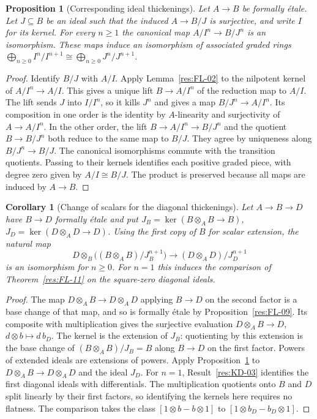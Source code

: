 \documentclass[11pt,oneside,openany]{book}
\newtheorem{proposition}[theorem]{Proposition}
\newtheorem{corollary}[theorem]{Corollary}
\theoremstyle{definition}
\theoremstyle{remark}
\begin{document}
\begin{proposition}[Corresponding ideal thickenings]\label{res:FL-14}
Let $A\to B$ be formally \'{e}tale. Let $J\subseteq B$ be an ideal such
that the induced $A\to B/J$ is surjective, and write $I$ for its kernel.
For every $n\ge1$ the canonical map
$A/I^n\to B/J^n$ is an isomorphism. These maps induce an isomorphism of
associated graded rings
$\bigoplus_{n\ge0} I^n/I^{n+1}\cong\bigoplus_{n\ge0}J^n/J^{n+1}$.
\end{proposition}
\begin{proof}
Identify $B/J$ with $A/I$. Apply Lemma~\ref{res:FL-02} to the nilpotent
kernel of $A/I^n\to A/I$. This gives a unique lift
$B\to A/I^n$ of the reduction map to $A/I$. The lift sends $J$ into
$I/I^n$, so it kills $J^n$ and gives a map $B/J^n\to A/I^n$.
Its composition in one order is the identity by $A$-linearity and
surjectivity of $A\to A/I^n$. In the other order, the lift
$B\to A/I^n\to B/J^n$ and the quotient $B\to B/J^n$ both reduce to the same
map to $B/J$. They agree by uniqueness along $B/J^n\to B/J$.
The canonical isomorphisms commute with the transition quotients.
Passing to their kernels identifies each positive graded piece, with
degree zero given by $A/I\cong B/J$. The product is preserved because all
maps are induced by $A\to B$.
\end{proof}

\begin{corollary}[Change of scalars for the diagonal thickenings]
\label{res:FL-15}
Let $A\to B\to D$ have $B\to D$ formally \'{e}tale and put
$J_B=\ker(B\otimes_A B\to B)$, $J_D=\ker(D\otimes_A D\to D)$.
Using the first copy of $B$ for scalar extension, the natural map
\[
 D\otimes_B \bigl((B\otimes_A B)/J_B^{n+1}\bigr)
    \longrightarrow (D\otimes_A D)/J_D^{n+1}
\]
is an isomorphism for $n\ge0$. For $n=1$ this induces the comparison of
Theorem~\ref{res:FL-11} on the square-zero diagonal ideals.
\end{corollary}
\begin{proof}
The map $D\otimes_A B\to D\otimes_A D$ applying $B\to D$ on the second
factor is a base change of that map, and so is formally \'{e}tale by
Proposition~\ref{res:FL-09}. Its composite with multiplication gives
the surjective evaluation $D\otimes_A B\to D$, $d\otimes b\mapsto d\,b_D$.
The kernel is the extension of $J_B$: quotienting by this extension
is the base change of $(B\otimes_A B)/J_B=B$ along $B\to D$ on the first
factor. Powers of extended ideals are extensions of powers. Apply
Proposition~\ref{res:FL-14} to $D\otimes_A B\to D\otimes_A D$ and the ideal
$J_D$. For $n=1$, Result~\ref{res:KD-03} identifies the first diagonal
ideals with differentials. The multiplication quotients onto $B$ and $D$
split linearly by their first factors, so identifying the kernels here
requires no flatness. The comparison takes the class
$[1\otimes b-b\otimes1]$ to $[1\otimes b_D-b_D\otimes1]$.
\end{proof}
\end{document}
